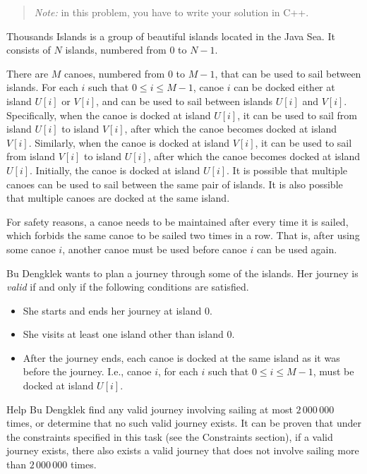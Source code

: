 
\begin{quote}
\textit{Note:} in this problem, you have to write your solution in C++.
\end{quote}

Thousands Islands is a group of beautiful islands located in the Java Sea. It consists of $N$ islands,
numbered from $0$ to $N-1$.

There are $M$ canoes, numbered from $0$ to $M-1$, that can be used to sail between islands. For each
$i$ such that $0 \leq i \leq M-1$, canoe $i$ can be docked either at island $U[i]$ or $V[i]$, and can
be used to sail between islands $U[i]$ and $V[i]$. Specifically, when the canoe is docked at island
$U[i]$, it can be used to sail from island $U[i]$ to island $V[i]$, after which the canoe becomes
docked at island $V[i]$. Similarly, when the canoe is docked at island $V[i]$, it can be used to sail
from island $V[i]$ to island $U[i]$, after which the canoe becomes docked at island $U[i]$. Initially,
the canoe is docked at island $U[i]$. It is possible that multiple canoes can be used to sail between
the same pair of islands. It is also possible that multiple canoes are docked at the same island.

For safety reasons, a canoe needs to be maintained after every time it is sailed, which forbids the
same canoe to be sailed two times in a row. That is, after using some canoe $i$, another canoe must be
used before canoe $i$ can be used again.

Bu Dengklek wants to plan a journey through some of the islands. Her journey is \emph{valid} if and
only if the following conditions are satisfied.
\begin{itemize}
  \item She starts and ends her journey at island $0$.
  \item She visits at least one island other than island $0$.
  \item After the journey ends, each canoe is docked at the same island as it was before the journey.
  I.e., canoe $i$, for each $i$ such that $0 \leq i \leq M-1$, must be docked at island $U[i]$.
\end{itemize}

Help Bu Dengklek find any valid journey involving sailing at most $2\,000\,000$ times, or determine
that no such valid journey exists. It can be proven that under the constraints specified in this task
(see the Constraints section), if a valid journey exists, there also exists a valid journey that does
not involve sailing more than $2\,000\,000$ times.

